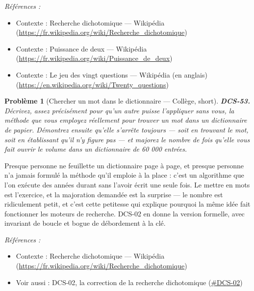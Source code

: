 \documentclass[11pt]{article}
\newtheorem{problem}{Problème}
\newenvironment{refs}{\par\small\noindent\emph{Références :}\begin{itemize}\setlength\itemsep{0pt}}{\end{itemize}\normalsize}
\begin{document}
\begin{refs}
\item Contexte : Recherche dichotomique --- Wikipédia (\url{https://fr.wikipedia.org/wiki/Recherche_dichotomique})
\item Contexte : Puissance de deux --- Wikipédia (\url{https://fr.wikipedia.org/wiki/Puissance_de_deux})
\item Contexte : Le jeu des vingt questions --- Wikipédia (en anglais) (\url{https://en.wikipedia.org/wiki/Twenty_questions})
\end{refs}

\bigskip

\begin{problem}[{Chercher un mot dans le dictionnaire --- Collège, short}]
\textbf{DCS-53.} Décrivez, assez précisément pour qu'un autre puisse
l'appliquer sans vous, la méthode que vous employez réellement pour trouver un mot dans un
dictionnaire de papier. Démontrez ensuite qu'elle s'arrête toujours --- soit en trouvant le
mot, soit en établissant qu'il n'y figure pas --- et majorez le nombre de fois qu'elle vous
fait ouvrir le volume dans un dictionnaire de 60 000 entrées.
\end{problem}

\noindent Presque personne ne feuillette un dictionnaire page à page, et presque
personne n'a jamais formulé la méthode qu'il emploie à la place : c'est un algorithme que
l'on exécute des années durant sans l'avoir écrit une seule fois. Le mettre en mots est
l'exercice, et la majoration demandée est la surprise --- le nombre est ridiculement petit,
et c'est cette petitesse qui explique pourquoi la même idée fait fonctionner les moteurs de
recherche. DCS-02 en donne la version formelle, avec invariant de boucle et bogue de
débordement à la clé.

\begin{refs}
\item Contexte : Recherche dichotomique --- Wikipédia (\url{https://fr.wikipedia.org/wiki/Recherche_dichotomique})
\item Voir aussi : DCS-02, la correction de la recherche dichotomique (\url{#DCS-02})
\end{refs}

\bigskip
\end{document}
